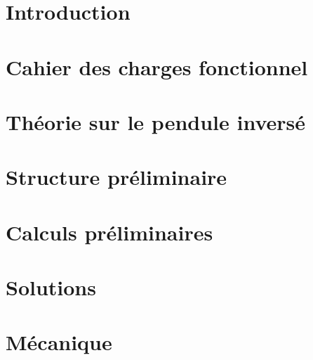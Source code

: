 \documentclass[
    iai, %
    mi, %
]{heig-tb}
\begin{document}
\maketitle
\frontmatter
\clearemptydoublepage

\preamble
\authentification

\begin{abstract}
  
\end{abstract}

\clearemptydoublepage
{
  \tableofcontents
  \let\cleardoublepage\clearpage
  \listoffigures
  \let\cleardoublepage\clearpage
  \listoftables
}

\printnomenclature
\clearemptydoublepage
{}

\mainmatter
\chapter{Introduction}


\chapter{Cahier des charges fonctionnel}


\chapter{Théorie sur le pendule inversé}


\chapter{Structure préliminaire}


\chapter{Calculs préliminaires}


\chapter{Solutions}


\chapter{Mécanique}

\end{document}
